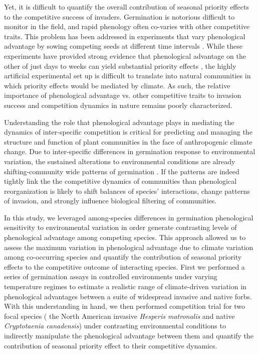 \documentclass{article}\usepackage[]{graphicx}\usepackage[]{color}
\begin{document}
Yet, it is difficult to quantify the overall contribution of seasonal priority effects to the competitive success of invaders. Germination is notorious difficult to monitor in the field, and rapid phenology often co-varies with other competitive traits\citep{Dickson2012,Milbau:2003vt,HAO:2009vh}. %
This problem has been addressed in experiments that vary phenological advantage by sowing competing seeds at different time intervals \citep{Young:2017aa}. While these experiments have provided strong evidence that phenological advantage on the other of just days to weeks can yield substantial priority effects \citep{Weidlich:2020aa}, the highly artificial experimental set up is difficult to translate into natural communities in which priority effects would be mediated by climate. As such, the relative importance of phenological advantage vs. other competitive traits to invasion success and competition dynamics in nature remains poorly characterized. %

Understanding the role that phenological advantage plays in mediating the dynamics of inter-specific competition is critical for predicting and managing the structure and function of plant communities in the face of anthropogenic climate change. Due  to inter-specific differences in germination response to environmental variation, the sustained alterations to environmental conditions are already shifting-community wide patterns of germination \citep{}. If the patterns are indeed tightly link the the competitive dynamics of communities than phenological reorganization is likely to shift balances of species' interactions, change patterns of invasion, and strongly influence biological filtering of communities. 

In this study, we leveraged among-species differences in germination phenological sensitivity to environmental variation in order generate contrasting levels of phenological advantage among competing species. This approach allowed us to assess the maximum variation in phenological advantage due to climate variation among co-occurring species and quantify the contribution of seasonal priority effects to the competitive outcome of interacting species. First we performed a series of germination assays in controlled environments under varying temperature regimes to estimate a realistic range of climate-driven variation in phenological advantages between a suite of widespread invasive and native forbs.  With this understanding in hand, we then performed competition trial for two focal species ( the North American invasive \textit{Hesperis matronalis} and native \textit{Cryptotaenia canadensis}) under contrasting environmental conditions to indirectly manipulate the phenological advantage between them and quantify the contribution of seasonal priority effect to their competitive dynamics.
\end{document}
